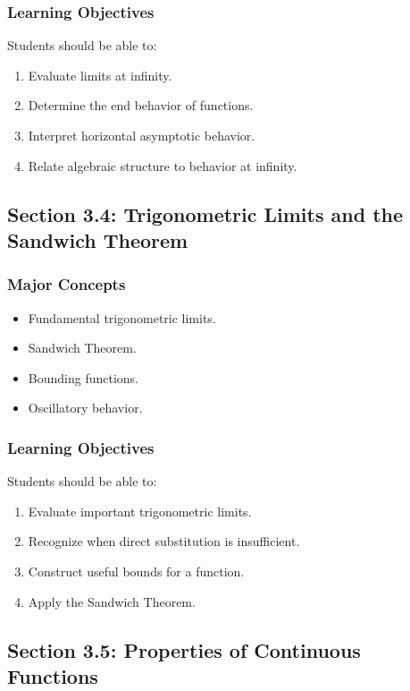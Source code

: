 \documentclass[11pt]{article}
\begin{document}
\subsubsection{Learning Objectives}

Students should be able to:

\begin{enumerate}
    \item Evaluate limits at infinity.
    \item Determine the end behavior of functions.
    \item Interpret horizontal asymptotic behavior.
    \item Relate algebraic structure to behavior at infinity.
\end{enumerate}

\subsection{Section 3.4: Trigonometric Limits and the Sandwich Theorem}

\subsubsection{Major Concepts}

\begin{itemize}
    \item Fundamental trigonometric limits.
    \item Sandwich Theorem.
    \item Bounding functions.
    \item Oscillatory behavior.
\end{itemize}

\subsubsection{Learning Objectives}

Students should be able to:

\begin{enumerate}
    \item Evaluate important trigonometric limits.
    \item Recognize when direct substitution is insufficient.
    \item Construct useful bounds for a function.
    \item Apply the Sandwich Theorem.
\end{enumerate}

\subsection{Section 3.5: Properties of Continuous Functions}
\end{document}
